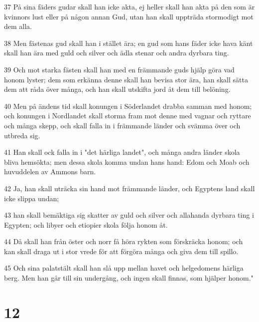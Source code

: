 \par 37 På sina fäders gudar skall han icke akta, ej heller skall han akta på den som är kvinnors lust eller på någon annan Gud, utan han skall uppträda stormodigt mot dem alla.
\par 38 Men fästenas gud skall han i stället ära; en gud som hans fäder icke hava känt skall han ära med guld och silver och ädla stenar och andra dyrbara ting.
\par 39 Och mot starka fästen skall han med en främmande guds hjälp göra vad honom lyster; dem som erkänna denne skall han bevisa stor ära, han skall sätta dem att råda över många, och han skall utskifta jord åt dem till belöning.
\par 40 Men på ändens tid skall konungen i Söderlandet drabba samman med honom; och konungen i Nordlandet skall storma fram mot denne med vagnar och ryttare och många skepp, och skall falla in i främmande länder och svämma över och utbreda sig.
\par 41 Han skall ock falla in i "det härliga landet", och många andra länder skola bliva hemsökta; men dessa skola komma undan hans hand: Edom och Moab och huvuddelen av Ammons barn.
\par 42 Ja, han skall uträcka sin hand mot främmande länder, och Egyptens land skall icke slippa undan;
\par 43 han skall bemäktiga sig skatter av guld och silver och allahanda dyrbara ting i Egypten; och libyer och etiopier skola följa honom åt.
\par 44 Då skall han från öster och norr få höra rykten som förskräcka honom; och kan skall draga ut i stor vrede för att förgöra många och giva dem till spillo.
\par 45 Och sina palatstält skall han slå upp mellan havet och helgedomens härliga berg. Men han går till sin undergång, och ingen skall finnas, som hjälper honom."

\chapter{12}

